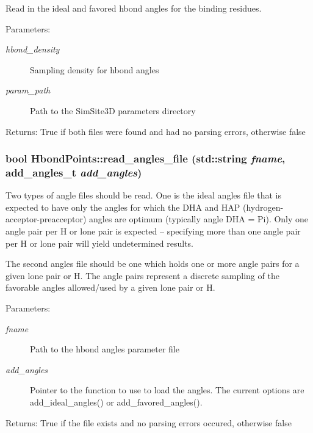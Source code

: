 Read in the ideal and favored hbond angles for the binding residues. 

\begin{Desc}
\item[Parameters:]
\begin{description}
\item[{\em hbond\_\-density}]Sampling density for hbond angles \item[{\em param\_\-path}]Path to the SimSite3D parameters directory \end{description}
\end{Desc}
\begin{Desc}
\item[Returns:]True if both files were found and had no parsing errors, otherwise false \end{Desc}
\subsubsection{\setlength{\rightskip}{0pt plus 5cm}bool Hbond\-Points::read\_\-angles\_\-file (std::string {\em fname}, add\_\-angles\_\-t {\em add\_\-angles})\hspace{0.3cm}{\tt  [private]}}\label{classSimSite3D_1_1HbondPoints_dd0d8a2958197f4affccd88818d0f90c}


Two types of angle files should be read. One is the ideal angles file that is expected to have only the angles for which the DHA and HAP (hydrogen-acceptor-preacceptor) angles are optimum (typically angle DHA = Pi). Only one angle pair per H or lone pair is expected -- specifying more than one angle pair per H or lone pair will yield undetermined results.

The second angles file should be one which holds one or more angle pairs for a given lone pair or H. The angle pairs represent a discrete sampling of the favorable angles allowed/used by a given lone pair or H. \begin{Desc}
\item[Parameters:]
\begin{description}
\item[{\em fname}]Path to the hbond angles parameter file \item[{\em add\_\-angles}]Pointer to the function to use to load the angles. The current options are add\_\-ideal\_\-angles() or add\_\-favored\_\-angles(). \end{description}
\end{Desc}
\begin{Desc}
\item[Returns:]True if the file exists and no parsing errors occured, otherwise false \end{Desc}
